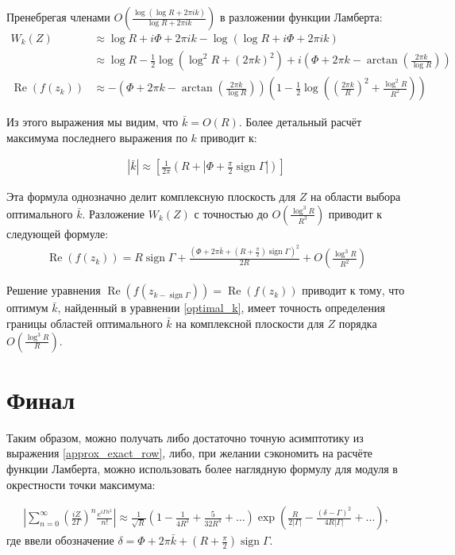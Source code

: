 \documentclass[a4paper, 12pt]{article}
\DeclareMathOperator*{\sign}{sign}
\DeclareMathOperator*{\Real}{Re}
\newenvironment{eqw}{\begin{equation} \begin{aligned}}   
    {\end{aligned}    \end{equation}}
\begin{document}

Пренебрегая членами $O\left(\frac{\log\left(\log R + 2\pi i k\right)}{\log R  + 2\pi i k}\right)$ в разложении функции Ламберта:
\begin{eqw}
    W_k\left(Z\right) &\approx \log R + i\Phi + 2\pi i k - \log\left(\log R + i\Phi+ 2\pi i k\right) \\
    &\approx \log R - \frac{1}{2}\log\left(\log^2 R + (2\pi k)^2\right) + 
    i\left(\Phi + 2\pi k - \arctan\left(\frac{2\pi k}{\log R}\right)\right) \\
    \Real\left(f(z_k)\right) &\approx
    -\left(\Phi + 2\pi k - \arctan\left(\frac{2\pi k}{\log R}\right)\right)\left(1-
    \frac{1}{2}\log \left(\left(\frac{2\pi k}{R}\right)^2+\frac{\log^2 R}{R^2}\right)
    \right)
\end{eqw}

Из этого выражения мы видим, что $\bar k = O(R)$. Более детальный расчёт максимума последнего выражения по $k$ приводит к:

\begin{eqw}\label{optimal_k}
    |\bar k|\approx \left[ \frac{1}{2\pi}\left(R + \left|\Phi + \frac{\pi}{2}\sign \Gamma\right|\right)\right]
\end{eqw}

Эта формула однозначно делит комплексную плоскость для $Z$ на области выбора оптимального $\bar k$. Разложение $W_{k}(Z)$ с точностью до $O\left(\frac{\log^3 R}{R^3}\right)$ приводит к следующей формуле:
\begin{eqw}
    \Real(f(z_k)) =  R\sign \Gamma + \frac{\left(\Phi + 2\pi \bar k +  \left(R+\frac{\pi}{2} \right)\sign\Gamma\right)^2}{2R} +
     O\left(\frac{\log^3 R}{R^2}\right)
\end{eqw}

Решение уравнения $\Real(f(z_{k-\sign \Gamma})) = \Real(f(z_{k}))$ приводит к тому, что оптимум $\bar k$, найденный в уравнении \ref{optimal_k}, имеет точность определения границы областей оптимального $\bar k$ на комплексной плоскости для $Z$ порядка $O\left(\frac{\log^3 R}{R}\right)$.

\section*{Финал}
Таким образом, можно получать либо достаточно точную асимптотику из выражения \ref{approx_exact_row}, либо, при желании сэкономить на расчёте функции Ламберта, можно использовать более наглядную формулу для модуля в окрестности точки максимума:

\begin{eqw}
    \left|\sum\limits_{n=0}^{\infty}\left(\frac{iZ}{2\Gamma}\right)^n  \frac{e^{i\Gamma n^2}}{n!} \right|\approx 
    \frac{1}{\sqrt{R}}\left(1-\frac{1}{4 R^2} + \frac{5}{32 R^4}+\dots\right)
    \exp\left(\frac{R}{2|\Gamma|} - \frac{\left(\delta -\Gamma\right)^2}{4R|\Gamma|}+\dots\right),
\end{eqw}
где ввели обозначение $\delta = \Phi + 2\pi \bar k +  \left(R+\frac{\pi}{2} \right)\sign\Gamma$.
\end{document}
